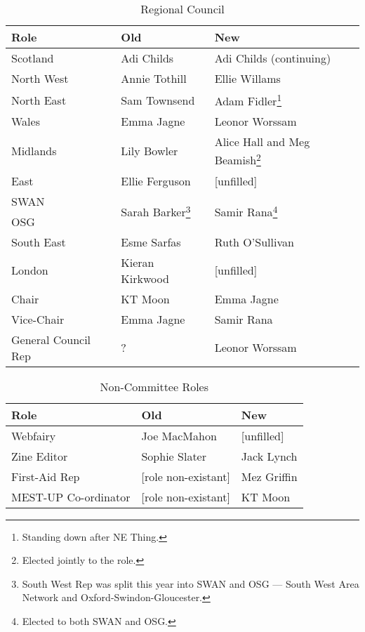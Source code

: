 \documentclass[a4paper, 12pt]{article}
\begin{document}
\begin{savenotes}
\begin{table}[H]
\centering

\begin{tabular}{ l || l | l }
\textbf{Role}		& \textbf{Old}		& \textbf{New} \\ \hline
Scotland			& Adi Childs		& Adi Childs (continuing) \\
North West			& Annie Tothill		& Ellie Willams \\
North East			& Sam Townsend		& Adam Fidler\footnote{Standing down after NE Thing.} \\
Wales				& Emma Jagne		& Leonor Worssam \\
Midlands			& Lily Bowler		& Alice Hall and Meg Beamish\footnote{Elected jointly to the role.} \\
East				& Ellie Ferguson	& [unfilled] \\
SWAN				& \multirow{2}{*}{Sarah Barker\footnote{South West Rep was split this year into SWAN and OSG --- South West Area Network and Oxford-Swindon-Gloucester.}} & \multirow{2}{*}{Samir Rana\footnote{Elected to both SWAN and OSG.}} \\
OSG					& 					&  \\
South East			& Esme Sarfas		& Ruth O'Sullivan \\
London				& Kieran Kirkwood	& [unfilled] \\
Chair				& KT Moon			& Emma Jagne \\
Vice-Chair			& Emma Jagne		& Samir Rana \\
General Council Rep	& ?					& Leonor Worssam \\
\end{tabular}
\caption{Regional Council}
\label{tab:council}
\end{table}
\end{savenotes}

\begin{savenotes}
\begin{table}[H]
\centering

\begin{tabular}{ l || l | l }
\textbf{Role}			& \textbf{Old}			& \textbf{New} \\ \hline
Webfairy				& Joe MacMahon			& [unfilled] \\
Zine Editor				& Sophie Slater			& Jack Lynch \\
First-Aid Rep			& [role non-existant]	& Mez Griffin \\
MEST-UP Co-ordinator	& [role non-existant]	& KT Moon \\
\end{tabular}
\caption{Non-Committee Roles}
\label{tab:nonctte}
\end{table}
\end{savenotes}
\end{document}
